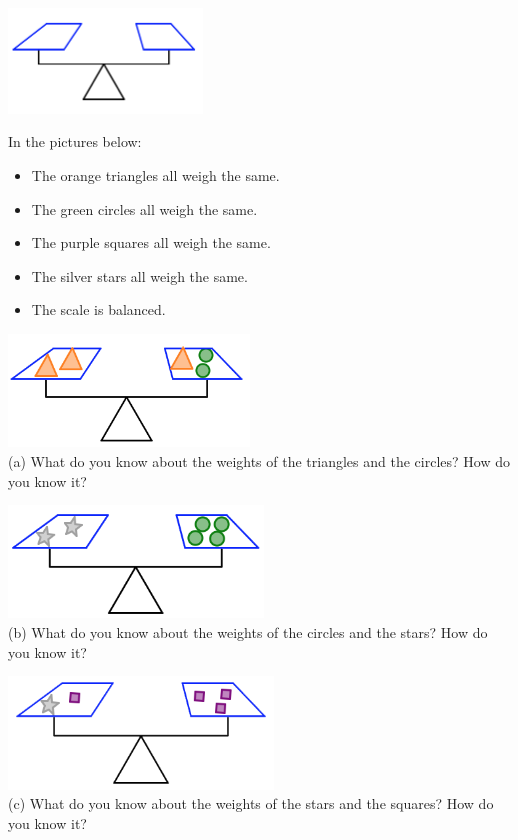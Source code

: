 \begin{center}
\includegraphics[height=2.8cm]{emptyscale}
\end{center}

\bigskip


\begin{thinkpair*}
In the pictures below:
\begin{itemize}
\item
The orange triangles all weigh the same.  
\item
The green circles all weigh the same.  
\item
The purple squares all weigh the same.  
\item
The silver stars all weigh the same.
\item
The scale is balanced.
\end{itemize}

\begin{center}
\includegraphics[height=3cm]{balancetalk1}\\
(a) What do you know about the weights of the triangles and the circles?  How do you know it?

\bigskip

\includegraphics[height=3cm]{balancetalk2}\\
(b) What do you know about the weights of the circles and the stars?  How do you know it?

\bigskip

\includegraphics[height=3cm]{balancetalk3}\\
(c) What do you know about the weights of the stars and the squares?  How do you know it?


\end{center}



\end{thinkpair*}


